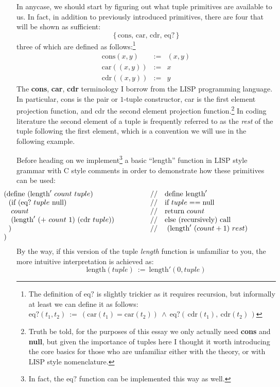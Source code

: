 \documentclass[twoside]{article}
\newcommand{\strong}[1]{{\bfseries #1}}
\newcommand{\twoqquad}{\ensuremath{\qquad\qquad}}
\newcommand{\cons}{\mbox{cons}}
\newcommand{\car}{\mbox{car}}
\newcommand{\cdr}{\mbox{cdr}}
\newcommand{\eq}{\mbox{eq?}}
\begin{document}
In anycase, we should start by figuring out what tuple primitives
are available to us. In fact, in addition to previously introduced primitives, there are four that will be shown as sufficient:
$$ \{\,\mbox{cons, car, cdr, eq?}\,\} $$
three of which are defined as follows:\footnote{The definition of $ \eq $ is slightly trickier as it requires recursion,
but informally at least we can define it as follows:
$ \eq(t_1,t_2)\ :=\ (\car(t_1) = \car(t_2))\ \wedge\ \eq(\,\cdr(t_1),\ \cdr(t_2)\,) $}
$$ \begin{array}{lcl}
\cons(x, y)	& := & (x, y)								\\
\car((x,y))	& := & x								\\
\cdr((x,y))	& := & y
\end{array} $$
The \strong{cons}, \strong{car}, \strong{cdr} terminology I borrow from the LISP programming language. In particular, cons
is the pair or $ 1 $-tuple constructor, car is the first element projection function, and cdr the second element projection
function.\footnote{Truth be told, for the purposes of this essay we only actually need \strong{cons} and \strong{null},
but given the importance of tuples here I thought it worth introducing the core basics for those who are unfamiliar
either with the theory, or with LISP style nomenclature.} In coding literature the second element of a tuple is
frequently referred to as the \emph{rest} of the tuple following the first element, which is a convention we
will use in the following example.

Before heading on we implement\footnote{In fact, the $ \eq $ function can be implemented this way as well.} a basic
``length'' function in LISP style grammar with C style comments in order to demonstrate how these primitives can be used:
$$ \hspace{-2cm}\begin{array}{lrl}
(\mbox{define}\ (\mbox{length}'\ count\ tuple)			& \twoqquad // & \mbox{define length}'			\\
\ \ (\mbox{if}\ (\eq\ tuple\ \mbox{null})			& \twoqquad // & \mbox{if } tuple == \mbox{null}	\\
\ \           \ count						& \twoqquad // & \mbox{return } count			\\
\ \           \ (\mbox{length}'\ (+\ count\ 1)\ (\cdr\ tuple))	& \twoqquad // & \mbox{else (recursively) call }	\\
\ \ )								& \twoqquad // & \ (\mbox{length}'\ (count + 1)\ rest)	\\
)
\end{array} $$
By the way, if this version of the tuple \emph{length} function is
unfamiliar to you, the more intuitive interpretation is achieved as:
$$ \mbox{length}(tuple)\ :=\ \mbox{length}'(0, tuple) $$
\end{document}
